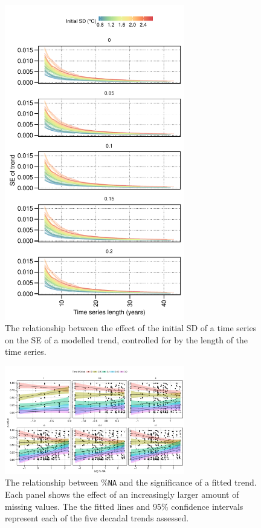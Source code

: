\documentclass[]{ametsoc}
\begin{document}
\begin{figure}
\centering \includegraphics[width=0.7\textwidth]{figure05}
\caption[\small The relationship between the effect of initial SD on the SE of a modelled trend]{The relationship between the effect of the initial SD of a time series on the SE of a modelled trend, controlled for by the length of the time series.}
\label{figure05}
\end{figure}

\begin{figure}
\centering \includegraphics[width=0.7\textwidth]{figure06}
\caption[\small The relationship between \%\texttt{NA} and the significance of a fitted trend]{The relationship between \%\texttt{NA} and the significance of a fitted trend. Each panel shows the effect of an increasingly larger amount of missing values. The the fitted lines and 95\% confidence intervals represent each of the five decadal trends assessed. }
\label{figure06}
\end{figure}
\end{document}
